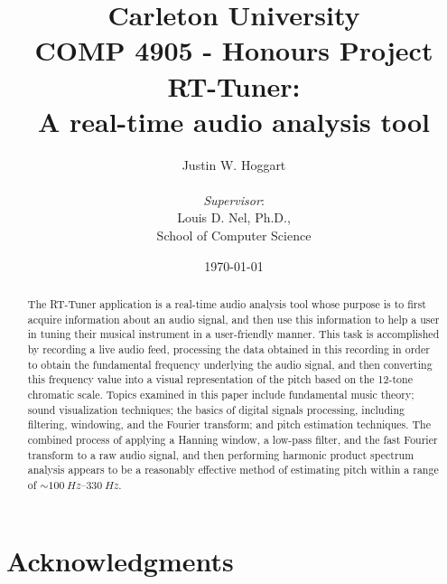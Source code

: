 \documentclass[12pt]{report}
\begin{document}
	

\title{\large{Carleton University \\
	COMP 4905 - Honours Project
	} \\
	\LARGE{\bf RT-Tuner:\\A real-time audio analysis tool}}
\author{Justin W. Hoggart \\
	\\\emph{Supervisor}: \\
	Louis D. Nel, Ph.D.,\\
	School of Computer Science}
\date{\today}

\maketitle
\clearpage

\begin{abstract}
	\thispagestyle{plain} %
	The RT-Tuner application is a real-time audio analysis tool whose purpose is to first acquire information about an audio signal, and then use this information to help a user in tuning their musical instrument in a user-friendly manner. This task is accomplished by recording a live audio feed, processing the data obtained in this recording in order to obtain the fundamental frequency underlying the audio signal, and then converting this frequency value into a visual representation of the pitch based on the 12-tone chromatic scale. Topics examined in this paper include fundamental music theory; sound visualization techniques; the basics of digital signals processing, including filtering, windowing, and the Fourier transform; and pitch estimation techniques. The combined process of applying a Hanning window, a low-pass filter, and the fast Fourier transform to a raw audio signal, and then performing harmonic product spectrum analysis appears to be a reasonably effective method of estimating pitch within a range of $\sim100~Hz$--$330~Hz$.
\end{abstract}
\clearpage

\chapter*{Acknowledgments}
\setcounter{page}{2} %
\end{document}
